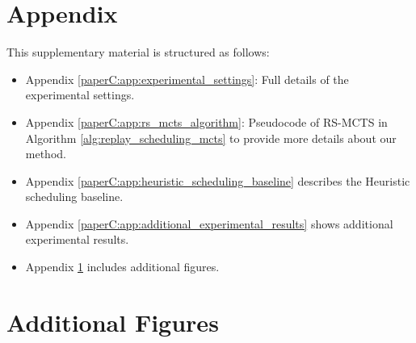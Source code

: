 

\section*{Appendix}
This supplementary material is structured as follows: 
\begin{itemize}
	\item Appendix \ref{paperC:app:experimental_settings}: Full details of the experimental settings.
	\item Appendix \ref{paperC:app:rs_mcts_algorithm}: Pseudocode of RS-MCTS in Algorithm \ref{alg:replay_scheduling_mcts} to provide more details about our method. 
	\item Appendix \ref{paperC:app:heuristic_scheduling_baseline} describes the Heuristic scheduling baseline.
	\item Appendix \ref{paperC:app:additional_experimental_results} shows additional experimental results. 
	\item Appendix \ref{paperC:app:additional_figures} includes additional figures. 
\end{itemize}






%
%

%









\section{Additional Figures}\label{paperC:app:additional_figures}


